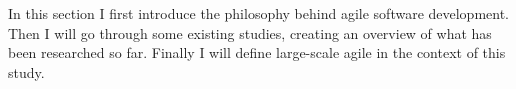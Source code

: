 In this section I first introduce the philosophy behind agile software
development. Then I will go through some existing studies, creating an overview
of what has been researched so far. Finally I will define large-scale agile in
the context of this study.
